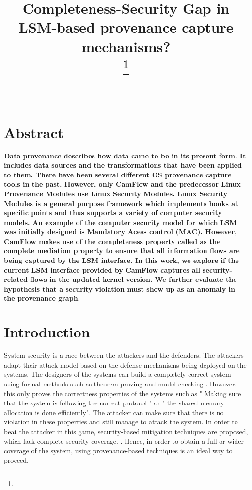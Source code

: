 \documentclass{IEEEtran}
\begin{document}
\title{Completeness-Security Gap in LSM-based provenance capture mechanisms?\\
{\footnotesize}
\thanks{}
}

\author{ \\


}

\maketitle
\large
\section*{Abstract}
	\large \textbf{Data provenance describes how data came to be in its present form. It includes data sources and the transformations that have been applied to them. There have been several different OS provenance capture tools in the past. However, only CamFlow and the predecessor Linux Provenance Modules use Linux Security Modules. Linux Security Modules is a general purpose framework which implements hooks at specific points and thus supports a variety of computer security models. An example of the computer security model for which LSM was initially designed is Mandatory Acess control (MAC).  However, CamFlow makes use of the completeness property called as the complete mediation property to ensure that all information flows are being captured by the LSM interface. In this work, we explore if the current LSM interface provided by CamFlow captures all security-related flows in the updated kernel version. We further evaluate the hypothesis that a security violation must show up as an anomaly in the provenance graph.  }








\section{Introduction}
System security is a race between the attackers and the defenders. The attackers adapt their attack model based on the defense mechanisms being deployed on the systems. The designers of the systems can build a completely correct system using formal methods such as theorem proving and model checking \cite{b4}. However, this only proves the correctness properties of the systems such as " Making sure that the system is following the correct protocol " or  " the shared memory allocation is done efficiently". The attacker can make sure that there is no violation in these properties and still manage to attack the system. In order to beat the attacker in this game, security-based mitigation techniques are proposed, which lack complete security coverage. \cite{b5}. Hence, in order to obtain a full or wider coverage of the system, using provenance-based techniques is an ideal way to proceed. \cite{b6}
\end{document}
